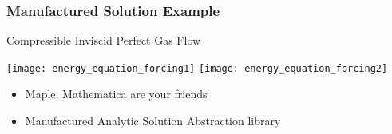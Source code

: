 \begin{frame}
\frametitle{Manufactured Solution Example}
\begin{block}{Compressible Inviscid Perfect Gas Flow}

\texttt{[image: energy\_equation\_forcing1]}
\texttt{[image: energy\_equation\_forcing2]}

\end{block}

\begin{itemize}
\item Maple, Mathematica are your friends
\item Manufactured Analytic Solution Abstraction library
\end{itemize}

\end{frame}
